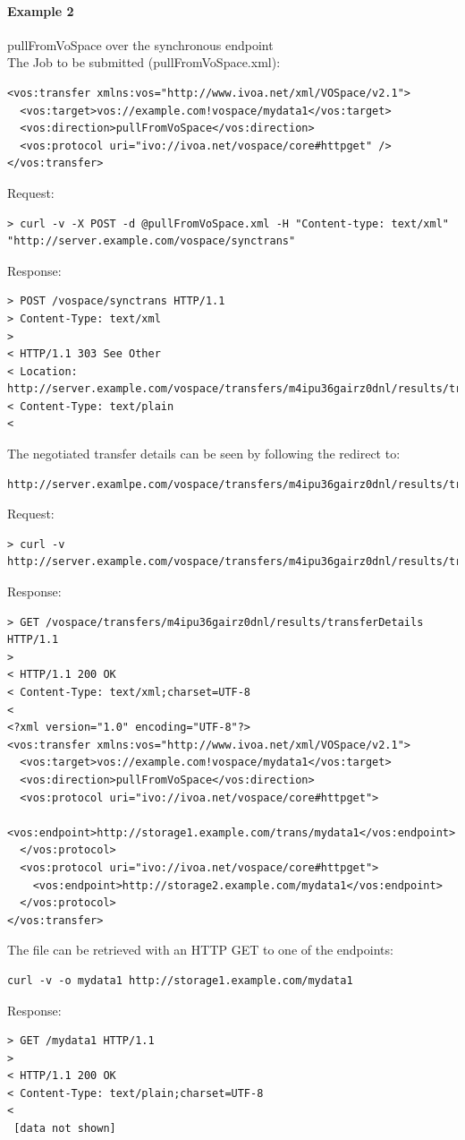 \documentclass[11pt,a4paper]{ivoa}
\begin{document}
\paragraph{Example 2}
pullFromVoSpace over the synchronous endpoint
\\[5px]
\noindent
The Job to be submitted (pullFromVoSpace.xml):
\begin{lstlisting}
<vos:transfer xmlns:vos="http://www.ivoa.net/xml/VOSpace/v2.1">
  <vos:target>vos://example.com!vospace/mydata1</vos:target>
  <vos:direction>pullFromVoSpace</vos:direction>
  <vos:protocol uri="ivo://ivoa.net/vospace/core#httpget" />
</vos:transfer>
\end{lstlisting}
Request:
\begin{lstlisting}
> curl -v -X POST -d @pullFromVoSpace.xml -H "Content-type: text/xml" "http://server.example.com/vospace/synctrans"
\end{lstlisting}
Response:
\begin{lstlisting}
> POST /vospace/synctrans HTTP/1.1
> Content-Type: text/xml
>
< HTTP/1.1 303 See Other
< Location: http://server.example.com/vospace/transfers/m4ipu36gairz0dnl/results/transferDetails
< Content-Type: text/plain
<
\end{lstlisting}
The negotiated transfer details can be seen by following the redirect to:
\begin{lstlisting}
http://server.examlpe.com/vospace/transfers/m4ipu36gairz0dnl/results/transferDetails
\end{lstlisting}
Request:
\begin{lstlisting}
> curl -v http://server.example.com/vospace/transfers/m4ipu36gairz0dnl/results/transferDetails
\end{lstlisting}
Response:
\begin{lstlisting}
> GET /vospace/transfers/m4ipu36gairz0dnl/results/transferDetails HTTP/1.1
>
< HTTP/1.1 200 OK
< Content-Type: text/xml;charset=UTF-8
<
<?xml version="1.0" encoding="UTF-8"?>
<vos:transfer xmlns:vos="http://www.ivoa.net/xml/VOSpace/v2.1">
  <vos:target>vos://example.com!vospace/mydata1</vos:target>
  <vos:direction>pullFromVoSpace</vos:direction>
  <vos:protocol uri="ivo://ivoa.net/vospace/core#httpget">
    <vos:endpoint>http://storage1.example.com/trans/mydata1</vos:endpoint>
  </vos:protocol>
  <vos:protocol uri="ivo://ivoa.net/vospace/core#httpget">
    <vos:endpoint>http://storage2.example.com/mydata1</vos:endpoint>
  </vos:protocol>
</vos:transfer>
\end{lstlisting}
The file can be retrieved with an HTTP GET to one of the endpoints:
\begin{lstlisting}
curl -v -o mydata1 http://storage1.example.com/mydata1
\end{lstlisting}
Response:
\begin{lstlisting}
> GET /mydata1 HTTP/1.1
>
< HTTP/1.1 200 OK
< Content-Type: text/plain;charset=UTF-8
<
 [data not shown]
\end{lstlisting}
\end{document}

